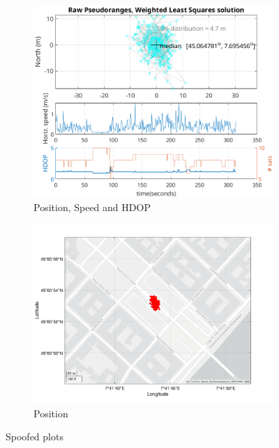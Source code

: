 \begin{figure}[h!]
\begin{subfigure}{0.22\textwidth}
                \includegraphics[width=\textwidth]{images/tests/Monte_Cappuccini/Spoofing/task5_figures/Samsung_A51_Monte_Cappuccini_fig4.png}
                \caption{Position, Speed and HDOP}
                \label{fig:Spoofed_c}
            \end{subfigure}
            \hfill
            \begin{subfigure}{0.23\textwidth}
                \vspace{0.40cm}
                \includegraphics[width=\textwidth]{images/tests/Monte_Cappuccini/Spoofing/task5_figures/Samsung_A51_Monte_Cappuccini_fig6.png}
                \caption{Position}
                \label{fig:Spoofed_d}
            \end{subfigure}
            \vspace{0.35cm}
            \caption{Spoofed plots}
            \label{fig:spoofed_plots}
        \end{figure}
        
